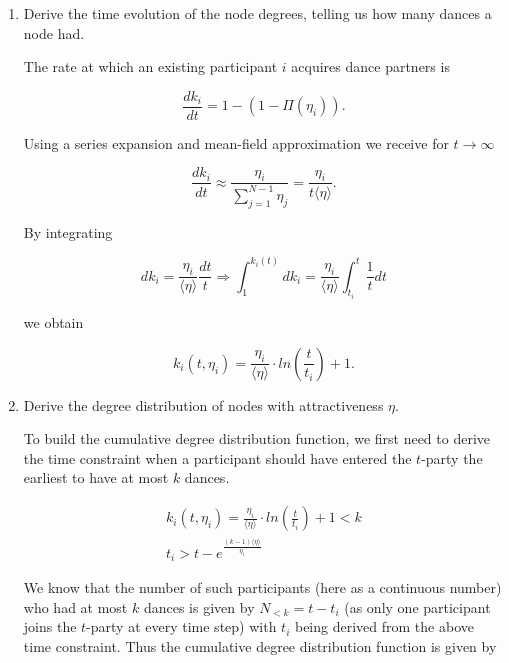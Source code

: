 \begin{enumerate}
	\item Derive the time evolution of the node degrees, telling us how many dances a node had.
	
	The rate at which an existing participant $i$ acquires dance partners is
	
	\begin{equation*}
		 \frac{dk_i}{dt} = 1 - (1 - \Pi(\eta_i)).
	\end{equation*}

	Using a series expansion and mean-field approximation we receive for $t \rightarrow \infty$
	
	\begin{equation*}
		\frac{dk_i}{dt} \approx \frac{\eta_i}{\sum_{j=1}^{N-1} \eta_j} = \frac{\eta_i}{t \langle \eta \rangle}.
	\end{equation*}

	By integrating 
	
	\begin{equation*}
		dk_i = \frac{\eta_i}{\langle \eta \rangle} \frac{dt}{t} \Rightarrow \int_{1}^{k_i(t)} dk_i = \frac{\eta_i}{\langle \eta \rangle} \int_{t_i}^{t} \frac{1}{t} dt
	\end{equation*}

	we obtain
	
	\begin{equation*}
		k_i(t, \eta_i) = \frac{\eta_i}{\langle \eta \rangle} \cdot ln(\frac{t}{t_i}) + 1.
	\end{equation*}
	
	\item Derive the degree distribution of nodes with attractiveness $\eta$.
	
	To build the cumulative degree distribution function, we first need to derive the time constraint when a participant should have entered the $t$-party the earliest to have at most $k$ dances.
	
	\begin{equation*}
		\begin{split}
			k_i(t, \eta_i) = \frac{\eta_i}{\langle \eta \rangle} \cdot ln(\frac{t}{t_i}) + 1 < k \\
			t_i > t - e^{\frac{(k - 1) \langle \eta \rangle}{\eta_i}}
		\end{split}
	\end{equation*}

	We know that the number of such participants (here as a continuous number) who had at most $k$ dances is given by $N_{<k} = t - t_i$ (as only one participant joins the $t$-party at every time step) with $t_i$ being derived from the above time constraint. Thus the cumulative degree distribution function is given by
	

\end{enumerate}
